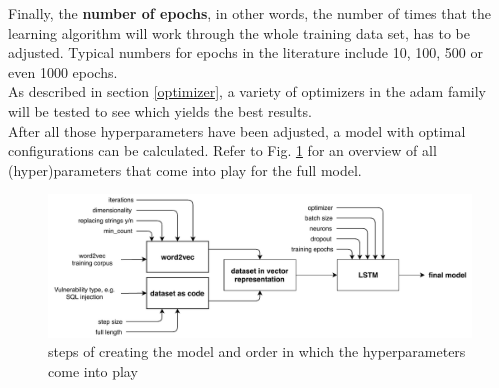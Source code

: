 \documentclass[
	a4paper,
	pagesize,
	pdftex,
	12pt,
	twoside, %
	BCOR=5mm, %
	ngerman,
	fleqn,
	final,
	]{scrartcl}
\begin{document}
Finally, the \textbf{number of epochs}, in other words, the number of times that the learning algorithm will work through the whole training data set, has to be adjusted. Typical numbers for epochs in the literature include 10, 100, 500 or even 1000 epochs.\\
As described in section \ref{optimizer}, a variety of optimizers in the adam family will be tested to see which yields the best results.\\
After all those hyperparameters have been adjusted, a model with optimal configurations can be calculated. Refer to Fig. \ref{fig:parameters} for an overview of all (hyper)parameters that come into play for the full model.

\begin{figure}[h]
	\centering
	\includegraphics[width=\linewidth]{img/Parameters}
	\caption{steps of creating the model and order in which the hyperparameters come into play}
	\label{fig:parameters}
\end{figure}
\end{document}
